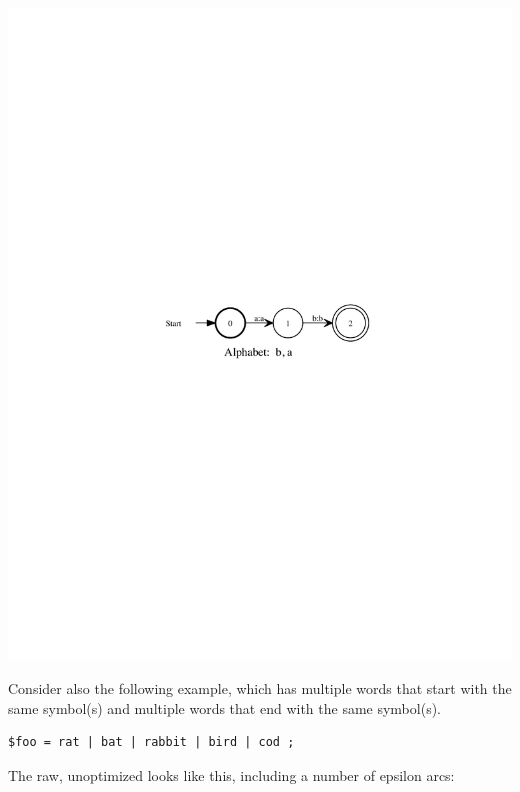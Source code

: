 \begin{center}
\includegraphics{images/aEpsbOptimized.pdf}
\end{center}

Consider also the following example, which has multiple words that start
with the same symbol(s) and multiple words that end with the same
symbol(s).


\begin{Verbatim}
$foo = rat | bat | rabbit | bird | cod ;
\end{Verbatim}

\noindent
The raw, unoptimized \fsm{} looks like this, including a number of
epsilon arcs:


